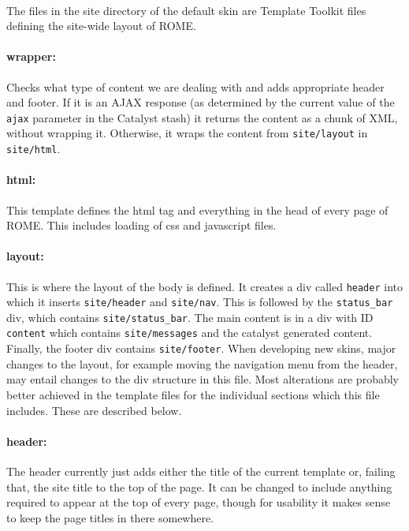 \paragraph{}
The files in the site directory of the default skin are Template Toolkit files defining the site-wide layout of ROME. 

\paragraph{wrapper: }
Checks what type of content we are dealing with and adds appropriate header and footer. If it is an AJAX response (as determined by the current value of the \texttt{ajax} parameter in the Catalyst stash) it returns the content as a chunk of XML, without wrapping it. Otherwise, it wraps the content from \texttt{site/layout} in \texttt{site/html}.

\paragraph{html: }
This template defines the html tag and everything in the head of every page of ROME. This includes loading of css and javascript files. 

\paragraph{layout: }
This is where the layout of the body is defined. It creates a div called \texttt{header} into which it inserts \texttt{site/header} and \texttt{site/nav}. This is followed by the \texttt{status\_bar} div, which contains \texttt{site/status\_bar}. The main content is in a div with ID \texttt{content} which contains \texttt{site/messages} and the catalyst generated content. Finally, the footer div contains \texttt{site/footer}. When developing new skins, major changes to the layout, for example moving the navigation menu from the header, may entail changes to the div structure in this file. Most alterations are probably better achieved in the template files for the individual sections which this file includes. These are described below.

\paragraph{header: }
The header currently just adds either the title of the current template or, failing that, the site title to the top of the page. It can be changed to include anything required to appear at the top of every page, though for usability it makes sense to keep the page titles in there somewhere.

